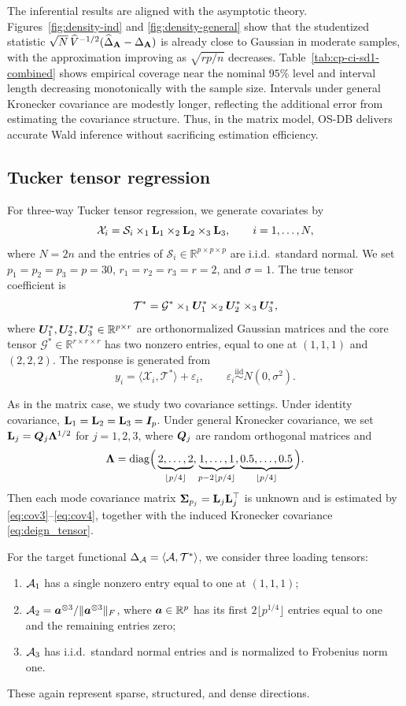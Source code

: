 \documentclass[authoryear,preprint,review,12pt]{elsarticle}
\begin{document}
The inferential results are aligned with the asymptotic theory.
Figures~\ref{fig:density-ind} and \ref{fig:density-general} show that the studentized statistic $\sqrt{N}\,\widehat V^{-1/2}(\widehat\Delta_{\mathbf{A}}-\Delta_{\mathbf{A}})$ is already close to Gaussian in moderate samples, with the approximation improving as $\sqrt{rp/n}$ decreases.
Table~\ref{tab:cp-ci-sd1-combined} shows empirical coverage near the nominal $95\%$ level and interval length decreasing monotonically with the sample size.
Intervals under general Kronecker covariance are modestly longer, reflecting the additional error from estimating the covariance structure.
Thus, in the matrix model, OS-DB delivers accurate Wald inference without sacrificing estimation efficiency.

\subsection{Tucker tensor regression}
For three-way Tucker tensor regression, we generate covariates by
\[
\mathcal X_i=\mathcal S_i\times_1 \mathbf{L}_1\times_2 \mathbf{L}_2\times_3 \mathbf{L}_3,
\qquad i=1,\ldots,N,
\]
where $N=2n$ and the entries of $\mathcal S_i\in\mathbb R^{p\times p\times p}$ are i.i.d.\ standard normal.
We set $p_1=p_2=p_3=p=30$, $r_1=r_2=r_3=r=2$, and $\sigma=1$.
The true tensor coefficient is
\[
\mathcal T^\ast=\mathcal G^\ast\times_1\boldsymbol U_1^\ast\times_2\boldsymbol U_2^\ast\times_3\boldsymbol U_3^\ast,
\]
where $\boldsymbol U_1^\ast,\boldsymbol U_2^\ast,\boldsymbol U_3^\ast\in\mathbb R^{p\times r}$ are orthonormalized Gaussian matrices and the core tensor $\mathcal G^\ast\in\mathbb R^{r\times r\times r}$ has two nonzero entries, equal to one at $(1,1,1)$ and $(2,2,2)$.
The response is generated from
\[
y_i=\langle \mathcal X_i,\mathcal T^\ast\rangle+\varepsilon_i,
\qquad
\varepsilon_i\stackrel{\mathrm{iid}}{\sim}N(0,\sigma^2).
\]

As in the matrix case, we study two covariance settings.
Under identity covariance, $\mathbf{L}_1=\mathbf{L}_2=\mathbf{L}_3=\boldsymbol I_p$.
Under general Kronecker covariance, we set $\mathbf{L}_j=\boldsymbol Q_j\boldsymbol \Lambda^{1/2}$ for $j=1,2,3$, where $\boldsymbol Q_j$ are random orthogonal matrices and
\[
\boldsymbol \Lambda=\mathrm{diag}\Big(\underbrace{2,\ldots,2}_{\lfloor p/4\rfloor},
\underbrace{1,\ldots,1}_{p-2\lfloor p/4\rfloor},
\underbrace{0.5,\ldots,0.5}_{\lfloor p/4\rfloor}\Big).
\]
Then each mode covariance matrix $\mathbf{ \Sigma}_{p_j}=\mathbf{L}_j\mathbf{L}_j^\top$ is unknown and is estimated by \eqref{eq:cov3}--\eqref{eq:cov4}, together with the induced Kronecker covariance \eqref{eq:deign_tensor}.

For the target functional $\Delta_{\mathcal{A}}=\langle \mathcal{A},\mathcal{T}^\ast\rangle$, we consider three loading tensors:
\begin{enumerate}[label=(\roman*)]
	\item $\mathcal{A}_1$ has a single nonzero entry equal to one at $(1,1,1)$;
	\item $\mathcal{A}_2=\boldsymbol a^{\otimes 3}/\|\boldsymbol a^{\otimes 3}\|_F$, where $\boldsymbol a\in\mathbb R^p$ has its first $2\lfloor p^{1/4}\rfloor$ entries equal to one and the remaining entries zero;
	\item $\mathcal{A}_3$ has i.i.d.\ standard normal entries and is normalized to Frobenius norm one.
\end{enumerate}
These again represent sparse, structured, and dense directions.
\end{document}
